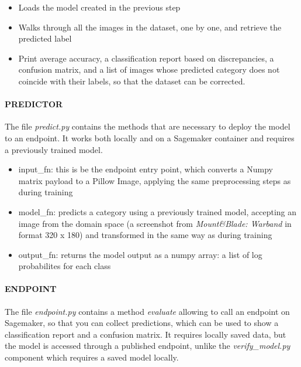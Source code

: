 \documentclass[
]{article}
\providecommand{\tightlist}{%
  \setlength{\itemsep}{0pt}\setlength{\parskip}{0pt}}
\begin{document}
\begin{itemize}
\tightlist
\item
  Loads the model created in the previous step
\item
  Walks through all the images in the dataset, one by one, and retrieve
  the predicted label
\item
  Print average accuracy, a classification report based on
  discrepancies, a confusion matrix, and a list of images whose
  predicted category does not coincide with their labels, so that the
  dataset can be corrected.
\end{itemize}

\hypertarget{predictor}{%
\paragraph{PREDICTOR}\label{predictor}}

The file \emph{predict.py} contains the methods that are necessary to
deploy the model to an endpoint. It works both locally and on a
Sagemaker container and requires a previously trained model.

\begin{itemize}
\tightlist
\item
  input\_fn: this is be the endpoint entry point, which converts a Numpy
  matrix payload to a Pillow Image, applying the same preprocessing
  steps as during training
\item
  model\_fn: predicts a category using a previously trained model,
  accepting an image from the domain space (a screenshot from
  \emph{Mount\&Blade: Warband} in format 320 x 180) and transformed in
  the same way as during training
\item
  output\_fn: returns the model output as a numpy array: a list of log
  probabilites for each class
\end{itemize}

\hypertarget{endpoint}{%
\paragraph{ENDPOINT}\label{endpoint}}

The file \emph{endpoint.py} contains a method \emph{evaluate} allowing
to call an endpoint on Sagemaker, so that you can collect predictions,
which can be used to show a classification report and a confusion
matrix. It requires locally saved data, but the model is accessed
through a published endpoint, unlike the \emph{verify\_model.py}
component which requires a saved model locally.
\end{document}
